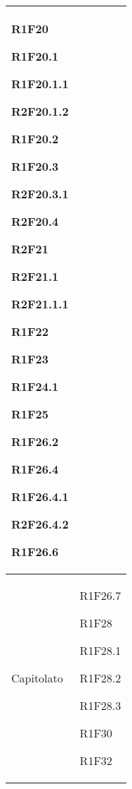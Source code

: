 \begin{center}
\begin{longtable}{|p{44mm}|p{22mm}|}
R1F20 \newline

R1F20.1 \newline

R1F20.1.1 \newline

R2F20.1.2 \newline

R1F20.2 \newline

R1F20.3 \newline

R2F20.3.1 \newline

R2F20.4 \newline

R2F21 \newline

R2F21.1 \newline

R2F21.1.1 \newline

R1F22 \newline

R1F23 \newline

R1F24.1 \newline

R1F25 \newline

R1F26.2 \newline

R1F26.4 \newline

R1F26.4.1 \newline

R2F26.4.2 \newline

R1F26.6
\\
\hline
Capitolato &
R1F26.7 \newline

R1F28 \newline

R1F28.1 \newline

R1F28.2 \newline

R1F28.3 \newline

R1F30 \newline

R1F32 \newline


\end{longtable}
\end{center}
